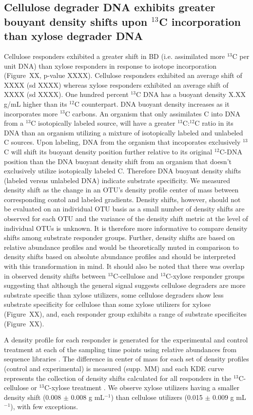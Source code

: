\subsection{Cellulose degrader DNA exhibits greater bouyant density shifts upon
$^{13}$C incorporation than xylose degrader DNA} 
Cellulose responders exhibited a greater shift in BD (i.e. assimilated more
$^{13}$C per unit DNA) than xylose responders in response to isotope
incorporation (Figure~XX, p-value XXXX). Cellulose responders exhibited an average shift of 
XXXX (sd XXXX) whereas xylose responders exhibited an average shift of XXXX (sd XXXX).
One hundred percent $^{13}$C DNA has a buoyant density X.XX g/mL higher than
its $^{12}$C counterpart. DNA buoyant density increases as it incorporates
more $^{13}$C carbons. An organism that only assimilates C into DNA from a
$^{13}$C isotopically labeled source, will have a greater $^{13}$C:$^{12}$C
ratio in its DNA than an organism utilizing a mixture of isotopically labeled
and unlabeled C sources. Upon labeling, DNA from the organism that incoporates
exclusively $^{13}$C will shift its buoyant density position further relative
to its original $^{12}$C-DNA position than the DNA buoyant density shift from
an organism that doesn't exclusively utilize isotopically labeled C. Therefore
DNA buoyant density shifts (labeled versus unlabeled DNA) indicate substrate
specificity.  We measured density shift as the change in an OTU's density
profile center of mass between corresponding contol and labeled gradients. Density
shifts, however, should not be evaluated on an individual OTU basis as a small
number of density shifts are observed for each OTU and the variance of the density
shift metric at the level of individual OTUs is unknown. It is therefore more
informative to compare density shifts among substrate responder groups. Further, density
shifts are based on relative abundance profiles and would be theoretically muted in comparison to
density shifts based on absolute abundance profiles and should be interpreted with this
transformation in mind. It should
also be noted that there was overlap in observed density shifts between $^{13}$C-cellulose
and $^{13}$C-xylose responder groups suggesting that although the general signal suggests
cellulose degraders are more substrate specific than xylose utilizers, some cellulose degraders
show less substrate specificity for cellulose than some xylose utilizers for xylose (Figure~XX), and, each responder group exhibits a range of substrate specificites (Figure~XX).

A density profile for each responder is generated for the experimental and
control treatment at each of the sampling time points using relative abundances
from sequence libraries . The difference in center of mass for each set of
density profiles (control and experimental) is measured (supp. MM) and each KDE
curve represents the collection of density shifts calculated for all responders
in the $^{13}$C-cellulose or $^{13}$C-xylose treatment . We observe xylose
utilizers having a smaller density shift (0.008 $\pm$ 0.008 g mL$^{-1}$) than
cellulose utilizers (0.015 $\pm$ 0.009 g mL$^{-1}$), with few exceptions. 

